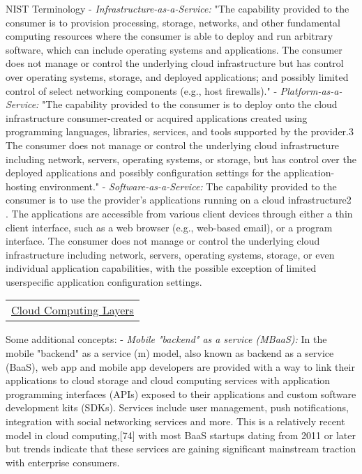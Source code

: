\documentclass[11pt]{article}
\begin{document}
NIST Terminology - \emph{Infrastructure-as-a-Service:} "The capability
provided to the consumer is to provision processing, storage, networks,
and other fundamental computing resources where the consumer is able to
deploy and run arbitrary software, which can include operating systems
and applications. The consumer does not manage or control the underlying
cloud infrastructure but has control over operating systems, storage,
and deployed applications; and possibly limited control of select
networking components (e.g., host firewalls)." -
\emph{Platform-as-a-Service:} "The capability provided to the consumer
is to deploy onto the cloud infrastructure consumer-created or acquired
applications created using programming languages, libraries, services,
and tools supported by the provider.3 The consumer does not manage or
control the underlying cloud infrastructure including network, servers,
operating systems, or storage, but has control over the deployed
applications and possibly configuration settings for the
application-hosting environment." - \emph{Software-as-a-Service:} The
capability provided to the consumer is to use the provider's
applications running on a cloud infrastructure2 . The applications are
accessible from various client devices through either a thin client
interface, such as a web browser (e.g., web-based email), or a program
interface. The consumer does not manage or control the underlying cloud
infrastructure including network, servers, operating systems, storage,
or even individual application capabilities, with the possible exception
of limited userspecific application configuration settings.

\begin{longtable}[]{@{}c@{}}
\toprule
\tabularnewline
\midrule
\endhead
\href{https://slideplayer.com/slide/4582525/}{Cloud Computing
Layers}\tabularnewline
\bottomrule
\end{longtable}

    Some additional concepts: - \emph{Mobile "backend" as a service
(MBaaS):} In the mobile "backend" as a service (m) model, also known as
backend as a service (BaaS), web app and mobile app developers are
provided with a way to link their applications to cloud storage and
cloud computing services with application programming interfaces (APIs)
exposed to their applications and custom software development kits
(SDKs). Services include user management, push notifications,
integration with social networking services and more. This is a
relatively recent model in cloud computing,{[}74{]} with most BaaS
startups dating from 2011 or later but trends indicate that these
services are gaining significant mainstream traction with enterprise
consumers.
\end{document}

